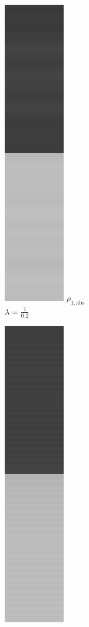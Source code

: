 \documentclass[onecolumn,final,a4paper,13pt,reqno]{siamart}
\begin{document}
\begin{figure}[t]
\begin{subfigure}[t]{0.08\textwidth}
	\end{subfigure}
	\begin{subfigure}[t]{0.08\textwidth}
		\includegraphics[scale=0.3]{pictures/denoising/signal/ipiano_absolute_02.png}
		\scriptsize $\rho_{1,\text{abs}}$\\[2px]
		\scriptsize $\lambda = \frac{1}{0.2}$
	\end{subfigure}
	\begin{subfigure}[t]{0.08\textwidth}
		\includegraphics[scale=0.3]{pictures/denoising/signal/ipiano_squared_02.png}

\end{subfigure}
\end{figure}
\end{document}
